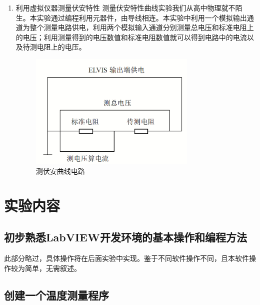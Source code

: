 \documentclass[UTF8]{article}
\begin{document}
\begin{enumerate}
    \item 利用虚拟仪器测量伏安特性
    \newline \hspace*{2em}测量伏安特性曲线实验我们从高中物理就不陌生。本实验通过编程利用元器件，由导线相连。本实验中利用一个模拟输出通道为整个测量电路供电，利用两个模拟输入通道分别测量总电压和标准电阻上的电压；利用测量得到的电压数值和标准电阻数值就可以得到电路中的电流以及待测电阻上的电压。
    \begin{figure}[H]
        \centering
        \includegraphics[width=8cm]{Fig/2.png}
        \caption{测伏安曲线电路}
    \end{figure}
    
\end{enumerate}


\section{实验内容}
\subsection{初步熟悉LabVIEW开发环境的基本操作和编程方法}
    此部分略过，具体操作将在后面实验中实现。鉴于不同软件操作不同，且本软件操作较为简单，无需叙述。
\subsection{创建一个温度测量程序}
\end{document}
